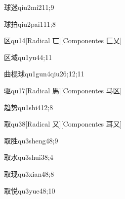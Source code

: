 \begin{verbete}{球迷}{qiu2mi2}{11;9}
\end{verbete}

\begin{verbete}{球拍}{qiu2pai1}{11;8}
\end{verbete}

\begin{verbete}{区}{qu1}{4}[Radical 匸][Componentes 匚乂]
\end{verbete}

\begin{verbete}{区域}{qu1yu4}{4;11}
\end{verbete}

\begin{verbete}{曲棍球}{qu1gun4qiu2}{6;12;11}
\end{verbete}

\begin{verbete}{驱}{qu1}{7}[Radical 馬][Componentes 马区]
\end{verbete}

\begin{verbete}{趋势}{qu1shi4}{12;8}
\end{verbete}

\begin{verbete}{取}{qu3}{8}[Radical 又][Componentes 耳又]
\end{verbete}

\begin{verbete}{取胜}{qu3sheng4}{8;9}
\end{verbete}

\begin{verbete}{取水}{qu3shui3}{8;4}
\end{verbete}

\begin{verbete}{取现}{qu3xian4}{8;8}
\end{verbete}

\begin{verbete}{取悦}{qu3yue4}{8;10}
\end{verbete}

